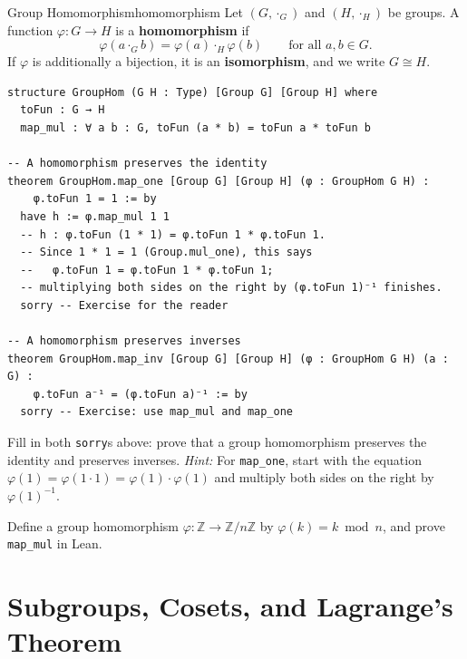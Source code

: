\documentclass[11pt, a4paper, oneside]{book}
\newcommand{\Z}{\mathbb{Z}}
\newcommand{\iso}{\cong}
\newcommand{\lc}[1]{\texttt{#1}}
\newcounter{exercise}[chapter]
\begin{document}
\begin{defn}{Group Homomorphism}{homomorphism}
Let $(G, \cdot_G)$ and $(H, \cdot_H)$ be groups. A function
$\varphi : G \to H$ is a \textbf{homomorphism} if
\[
  \varphi(a \cdot_G b) = \varphi(a) \cdot_H \varphi(b)
  \qquad \text{for all } a, b \in G.
\]
If $\varphi$ is additionally a bijection, it is an \textbf{isomorphism}, and
we write $G \iso H$.
\end{defn}

\begin{leanbox}
\begin{verbatim}
structure GroupHom (G H : Type) [Group G] [Group H] where
  toFun : G → H
  map_mul : ∀ a b : G, toFun (a * b) = toFun a * toFun b

-- A homomorphism preserves the identity
theorem GroupHom.map_one [Group G] [Group H] (φ : GroupHom G H) :
    φ.toFun 1 = 1 := by
  have h := φ.map_mul 1 1
  -- h : φ.toFun (1 * 1) = φ.toFun 1 * φ.toFun 1.
  -- Since 1 * 1 = 1 (Group.mul_one), this says
  --   φ.toFun 1 = φ.toFun 1 * φ.toFun 1;
  -- multiplying both sides on the right by (φ.toFun 1)⁻¹ finishes.
  sorry -- Exercise for the reader

-- A homomorphism preserves inverses
theorem GroupHom.map_inv [Group G] [Group H] (φ : GroupHom G H) (a : G) :
    φ.toFun a⁻¹ = (φ.toFun a)⁻¹ := by
  sorry -- Exercise: use map_mul and map_one
\end{verbatim}
\end{leanbox}

\begin{exercisebox}[title={Exercise 1.4}]
Fill in both \lc{sorry}s above: prove that a group homomorphism preserves the
identity and preserves inverses. \emph{Hint:} For \lc{map\_one}, start with
the equation $\varphi(1) = \varphi(1 \cdot 1) = \varphi(1) \cdot \varphi(1)$
and multiply both sides on the right by $\varphi(1)^{-1}$.
\end{exercisebox}

\begin{exercisebox}[title={Exercise 1.5}]
Define a group homomorphism $\varphi : \Z \to \Z/n\Z$ by
$\varphi(k) = k \bmod n$, and prove \lc{map\_mul} in Lean.
\end{exercisebox}

\chapter{Subgroups, Cosets, and Lagrange's Theorem}
\end{document}
